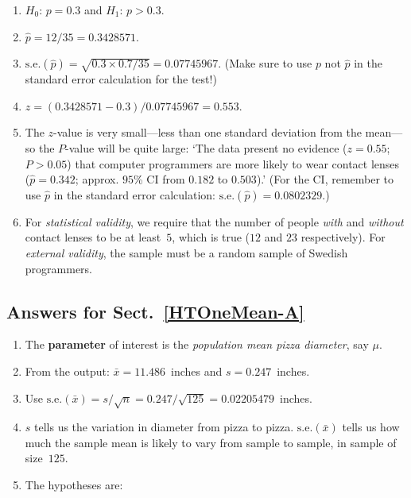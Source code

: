 \documentclass[
  11pt,
  a4paper,
  krantz2]{krantz}
\providecommand{\tightlist}{%
  \setlength{\itemsep}{0pt}\setlength{\parskip}{0pt}}
\begin{document}
\begin{footnotesize}
\begin{enumerate}
\def\labelenumi{\arabic{enumi}.}
\tightlist
\item
  \(H_0\): \(p = 0.3\) and \(H_1\): \(p > 0.3\).
\item
  \(\hat{p} = 12/35 = 0.3428571\).
\item
  \(\text{s.e.}(\hat{p})
  = \sqrt{0.3 \times 0.7/35} = 0.07745967\).
  (Make sure to use \(p\) not \(\hat{p}\) in the standard error calculation for the test!)
\item
  \(z = (0.3428571 - 0.3)/0.07745967 = 0.553\).
\item
  The \(z\)-value is very small---less than one standard deviation from the mean---so the \(P\)-value will be quite large:
  `The data present no evidence (\(z = 0.55\); \(P > 0.05\)) that computer programmers are more likely to wear contact lenses (\(\hat{p} = 0.342\); approx. \(95\)\% CI from \(0.182\) to \(0.503\)).'
  (For the CI, remember to use \(\hat{p}\) in the standard error calculation: \(\text{s.e.}(\hat{p}) = 0.0802329\).)
\item
  For \emph{statistical validity}, we require that the number of people \emph{with} and \emph{without} contact lenses to be at least~\(5\), which is true (\(12\) and \(23\) respectively).
  For \emph{external validity}, the sample must be a random sample of Swedish programmers.
\end{enumerate}

\subsection*{Answers for Sect.~\ref{HTOneMean-A}}\label{answers-for-sect.-refhtonemean-a}

\begin{enumerate}
\def\labelenumi{\arabic{enumi}.}
\item
  The \textbf{parameter} of interest is the \emph{population mean pizza diameter}, say \(\mu\).\tightlist
\item
  From the output: \(\bar{x} = 11.486\)~inches and \(s = 0.247\)~inches.
\item
  Use \(\text{s.e.}(\bar{x}) = s/\sqrt{n} = 0.247/\sqrt{125} = 0.02205479\)~inches.
\item
  \(s\) tells us the variation in diameter from pizza to pizza.
  \(\text{s.e.}(\bar{x})\) tells us how much the sample mean is likely to vary from sample to sample, in sample of size~\(125\).
\item
  The hypotheses are:


\end{enumerate}
\end{footnotesize}
\end{document}
